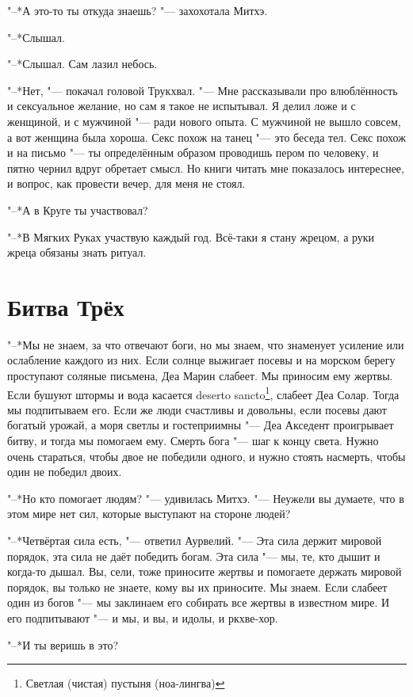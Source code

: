 \documentclass[a4paper,10pt]{book}
\begin{document}
"--*А это-то ты откуда знаешь? "--- захохотала Митхэ.

"--*Слышал.

"--*Слышал. Сам лазил небось.

"--*Нет, "--- покачал головой Трукхвал. "--- Мне рассказывали про влюблённость 
и 
сексуальное желание, 
но сам я такое не испытывал. Я делил ложе и с женщиной, и с мужчиной "--- ради 
нового опыта.
С мужчиной не вышло совсем, а вот женщина была хороша. Секс похож на танец "--- 
это беседа тел.
Секс похож и на письмо "--- ты определённым образом проводишь пером по 
человеку, 
и пятно чернил вдруг обретает смысл.
Но книги читать мне показалось интереснее, и вопрос, как провести вечер, для 
меня не стоял.

"--*А в Круге ты участвовал?

"--*В Мягких Руках участвую каждый год. Всё-таки я стану жрецом, а руки жреца 
обязаны знать ритуал.

\section{Битва Трёх}

"--*Мы не знаем, за что отвечают боги, но мы знаем, что знаменует усиление или 
ослабление каждого из них. Если солнце выжигает посевы и на морском берегу 
проступают соляные письмена, Деа Марин слабеет. Мы приносим ему жертвы. Если 
бушуют штормы и вода касается deserto sancto\footnote{Светлая (чистая) пустыня 
(ноа-лингва)}, слабеет Деа Солар. Тогда мы 
подпитываем его. Если же люди счастливы и довольны, если посевы дают богатый 
урожай, а моря светлы и гостеприимны "--- Деа Акседент проигрывает битву, и 
тогда мы помогаем ему. Смерть бога "--- шаг к концу света. Нужно очень 
стараться, чтобы двое не победили одного, и нужно стоять насмерть, чтобы один 
не победил двоих.

"--*Но кто помогает людям? "--- удивилась Митхэ. "--- Неужели вы думаете, что в 
этом мире нет сил, которые выступают на стороне людей?

"--*Четвёртая сила есть, "--- ответил Аурвелий. "--- Эта сила держит мировой 
порядок, эта сила не даёт победить богам. Эта сила "--- мы, те, кто дышит и 
когда-то дышал. Вы, сели, тоже приносите жертвы и помогаете держать мировой 
порядок, вы только не знаете, кому вы их приносите. Мы знаем. Если слабеет один 
из богов "--- мы заклинаем его собирать все жертвы в известном мире. И его 
подпитывают "--- и мы, и вы, и идолы, и ркхве-хор.

"--*И ты веришь в это?
\end{document}
